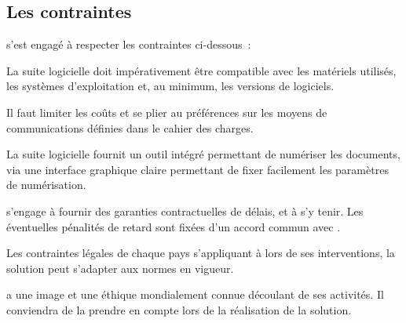 \subsection{Les contraintes}
\amo s'est engagé à respecter les contraintes ci-dessous~:
\begin{constraint}
La suite logicielle doit impérativement être compatible avec les matériels utilisés, les systèmes d'exploitation et, au minimum, les versions de logiciels.
\end{constraint}
\begin{constraint}
Il faut limiter les coûts et se plier au préférences sur les moyens de communications définies dans le cahier des charges.
\end{constraint}
\begin{constraint}
La suite logicielle fournit un outil intégré permettant de numériser les documents, via une interface graphique claire permettant de fixer facilement les paramètres de numérisation.
\end{constraint}
\begin{constraint}
\amo s'engage à fournir des garanties contractuelles de délais, et à s'y tenir. Les éventuelles pénalités de retard sont fixées d'un accord commun avec \mo.
\end{constraint}
\begin{constraint}
Les contraintes légales de chaque pays s'appliquant à \mo lors de ses interventions, la solution peut s'adapter aux normes en vigueur.
\end{constraint}
\begin{constraint}
\mo a une image et une éthique mondialement connue découlant de ses activités. Il conviendra de la prendre en compte lors de la réalisation de la solution.
\end{constraint}
